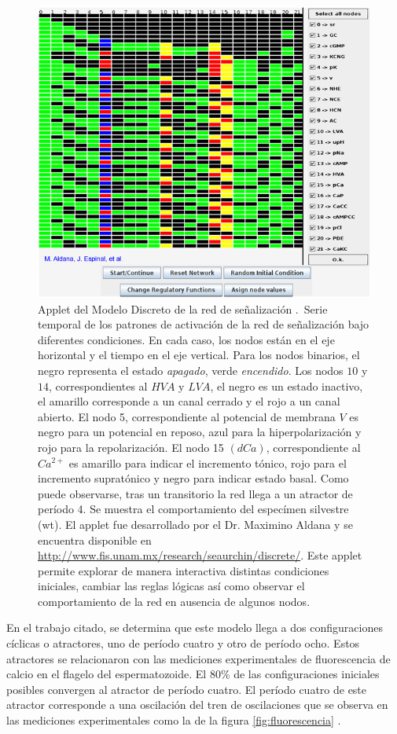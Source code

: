 \begin{figure}[hbt]
\includegraphics[width=0.9\linewidth%
]{gfx/appletErizo}
\caption[Applet del Modelo Discreto]{Applet del Modelo Discreto de la red de se\~nalizaci\'on \citeauthor{Espinal2011} \citep{Espinal2011}.\ Serie temporal de los patrones de activación de la red de señalización bajo diferentes condiciones. En cada caso, los nodos están en el eje horizontal y el tiempo en el eje vertical. Para los nodos binarios, el negro representa el estado \emph{apagado}, verde \emph{encendido}. Los nodos $10$ y $14$, correspondientes al $HVA$ y $LVA$, el negro es un estado inactivo, el amarillo corresponde a un canal cerrado y el rojo a un canal abierto. El nodo 5, correspondiente al potencial de membrana $V$ es negro para un potencial en reposo, azul para la hiperpolarización y rojo para la repolarización. El nodo 15 $(dCa)$, correspondiente al $Ca^{2+}$ es amarillo para indicar el incremento tónico, rojo para el incremento supratónico y negro para indicar estado basal. Como puede observarse, tras un transitorio la red llega a un atractor de período 4. Se muestra el comportamiento del especímen silvestre (wt).
El applet fue desarrollado por el Dr. Maximino Aldana y se encuentra disponible en \url{http://www.fis.unam.mx/research/seaurchin/discrete/}. Este applet permite explorar de manera interactiva distintas condiciones iniciales, cambiar las reglas lógicas así como observar el comportamiento de la red en ausencia de algunos nodos.}\label{fig:appletErizo}
\end{figure}

En el trabajo citado, se determina que este modelo llega a dos configuraciones cíclicas o atractores, uno de período cuatro y otro de período ocho. Estos atractores se relacionaron con las mediciones experimentales de fluorescencia de calcio en el flagelo del espermatozoide. El 80\% de las configuraciones iniciales posibles convergen al atractor de período cuatro. El período cuatro de este atractor corresponde a una oscilación del tren de oscilaciones que se observa en las mediciones experimentales como la de la figura \ref{fig:fluorescencia} \citeauthor{Espinal2011} \citep{Espinal2011}.

